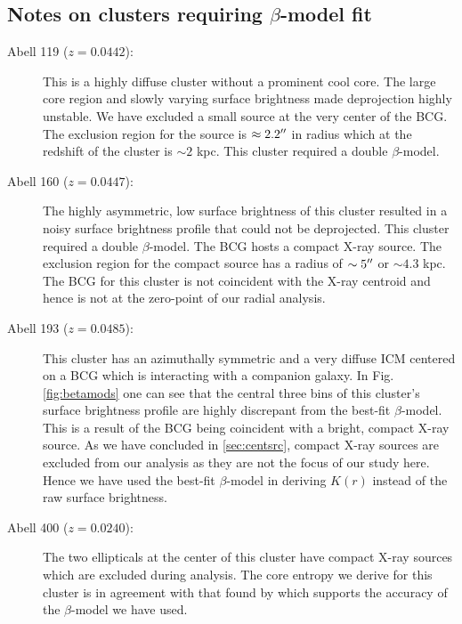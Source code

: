 \begin{appendix}

\section{Notes on clusters requiring $\beta$-model fit}
\label{app:beta}

\begin{description}
\item[Abell 119 ($z=0.0442$):] This is a highly diffuse cluster
  without a prominent cool core. The large core region and slowly
  varying surface brightness made deprojection highly unstable. We
  have excluded a small source at the very center of the BCG. The
  exclusion region for the source is $\approx 2.2\mbox{$^{\prime\prime}$}$ in radius
  which at the redshift of the cluster is $\sim 2$ kpc. This cluster
  required a double $\beta$-model.

\item[Abell 160 ($z=0.0447$):] The highly asymmetric, low surface
  brightness of this cluster resulted in a noisy surface brightness
  profile that could not be deprojected. This cluster required a
  double $\beta$-model. The BCG hosts a compact X-ray source. The
  exclusion region for the compact source has a radius of $\sim
  5\mbox{$^{\prime\prime}$}$ or $\sim 4.3$ kpc. The BCG for this cluster is not
  coincident with the X-ray centroid and hence is not at the
  zero-point of our radial analysis.

\item[Abell 193 ($z=0.0485$):] This cluster has an azimuthally
  symmetric and a very diffuse ICM centered on a BCG which is
  interacting with a companion galaxy. In Fig. \ref{fig:betamods} one
  can see that the central three bins of this cluster's surface
  brightness profile are highly discrepant from the best-fit
  $\beta$-model. This is a result of the BCG being coincident with a
  bright, compact X-ray source. As we have concluded in
  \ref{sec:centsrc}, compact X-ray sources are excluded from our
  analysis as they are not the focus of our study here. Hence we have
  used the best-fit $\beta$-model in deriving $K(r)$ instead of the
  raw surface brightness.

\item[Abell 400 ($z=0.0240$):] The two ellipticals at the center of
  this cluster have compact X-ray sources which are excluded during
  analysis. The core entropy we derive for this cluster is in
  agreement with that found by \cite{2006A&A...453..433H} which
  supports the accuracy of the $\beta$-model we have used.


\end{description}
\end{appendix}
